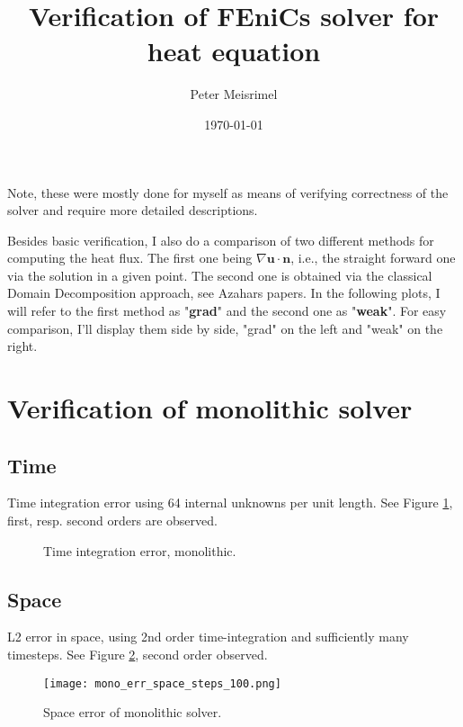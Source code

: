 \documentclass[a4paper,10pt]{article}
\title{Verification of FEniCs solver for heat equation}
\author{Peter Meisrimel}
\date{\today}
\begin{document}
\maketitle
\tableofcontents
\newpage

Note, these were mostly done for myself as means of verifying correctness of the solver and require more detailed descriptions. 

Besides basic verification, I also do a comparison of two different methods for computing the heat flux. The first one being $\nabla \bm{u} \cdot \bm{n}$, i.e., the straight forward one via the solution in a given point. The second one is obtained via the classical Domain Decomposition approach, see Azahars papers. In the following plots, I will refer to the first method as "\textbf{grad}" and the second one as "\textbf{weak}". For easy comparison, I'll display them side by side, "grad" on the left and "weak" on the right.

\section{Verification of monolithic solver}
\FloatBarrier
\subsection{Time}
Time integration error using 64 internal unknowns per unit length. See Figure \ref{FIG MONO TIME}, first, resp. second orders are observed.

\begin{figure}[ht!]
\caption{Time integration error, monolithic.}
\label{FIG MONO TIME}
\end{figure}
% 
\FloatBarrier
\subsection{Space}
L2 error in space, using 2nd order time-integration and sufficiently many timesteps. See Figure \ref{FIG MONO SPACE}, second order observed.

\begin{figure}[ht!]
\begin{center}
\texttt{[image: mono\_err\_space\_steps\_100.png]}
\caption{Space error of monolithic solver.}
\label{FIG MONO SPACE}
\end{center}
\end{figure}
% 
\FloatBarrier
\end{document}
